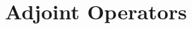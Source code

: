 \documentclass[../../script.tex]{subfiles}
\begin{document}
    \section{Adjoint Operators}

    
\end{document}
